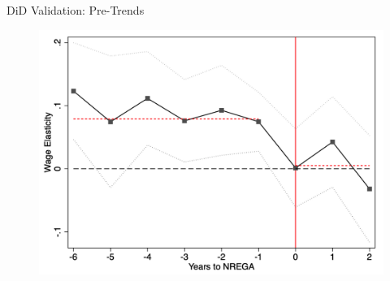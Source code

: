 \begin{frame}{DiD Validation: Pre-Trends}
{\begin{figure}
            \includegraphics[height = 0.7 \textheight]{images/pretrend3.png}
        \end{figure}
    }
 \end{frame}

 
 
